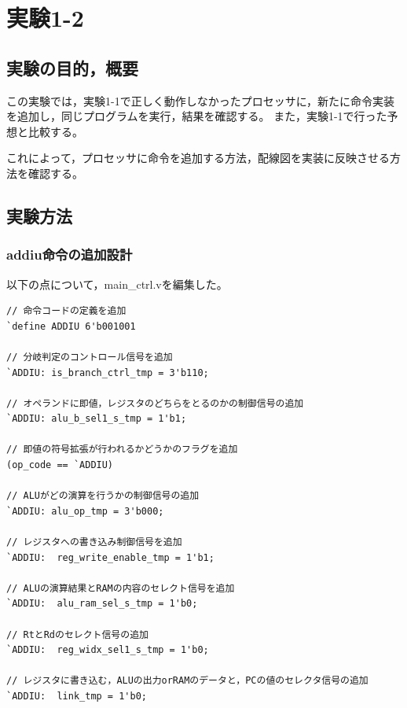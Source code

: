 \section{実験1-2}
\subsection{実験の目的，概要}
この実験では，実験1-1で正しく動作しなかったプロセッサに，新たに命令実装を追加し，同じプログラムを実行，結果を確認する。
また，実験1-1で行った予想と比較する。

これによって，プロセッサに命令を追加する方法，配線図を実装に反映させる方法を確認する。

\subsection{実験方法}
\subsubsection{addiu命令の追加設計}
以下の点について，main\_ctrl.vを編集した。
\begin{lstlisting}[caption={addiu命令の追加設計},label={addiu命令の追加設計}]
// 命令コードの定義を追加
`define ADDIU 6'b001001

// 分岐判定のコントロール信号を追加
`ADDIU: is_branch_ctrl_tmp = 3'b110;

// オペランドに即値，レジスタのどちらをとるのかの制御信号の追加
`ADDIU: alu_b_sel1_s_tmp = 1'b1;

// 即値の符号拡張が行われるかどうかのフラグを追加
(op_code == `ADDIU)

// ALUがどの演算を行うかの制御信号の追加
`ADDIU: alu_op_tmp = 3'b000;

// レジスタへの書き込み制御信号を追加
`ADDIU:  reg_write_enable_tmp = 1'b1;

// ALUの演算結果とRAMの内容のセレクト信号を追加
`ADDIU:  alu_ram_sel_s_tmp = 1'b0;

// RtとRdのセレクト信号の追加
`ADDIU:  reg_widx_sel1_s_tmp = 1'b0;

// レジスタに書き込む，ALUの出力orRAMのデータと，PCの値のセレクタ信号の追加
`ADDIU:  link_tmp = 1'b0;

\end{lstlisting}

